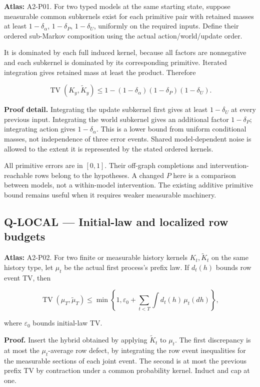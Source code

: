 \documentclass[
  11pt,
  a4paper,
]{article}
\begin{document}
\textbf{Atlas:} A2-P01. For two typed models at the same starting state,
suppose measurable common subkernels exist for each primitive pair with
retained masses at least \(1-\delta_\alpha\), \(1-\delta_P\),
\(1-\delta_U\), uniformly on the required inputs. Define their ordered
sub-Markov composition using the actual action/world/update order.

It is dominated by each full induced kernel, because all factors are
nonnegative and each subkernel is dominated by its corresponding
primitive. Iterated integration gives retained mass at least the
product. Therefore

\[\operatorname{TV}(K_y,\widetilde K_y)
\le1-(1-\delta_\alpha)(1-\delta_P)(1-\delta_U).\]

\textbf{Proof detail.} Integrating the update subkernel first gives at
least \(1-\delta_U\) at every previous input. Integrating the world
subkernel gives an additional factor \(1-\delta_P\); integrating action
gives \(1-\delta_\alpha\). This is a lower bound from uniform
conditional masses, not independence of three error events. Shared
model-dependent noise is allowed to the extent it is represented by the
stated ordered kernels.

All primitive errors are in \([0,1]\). Their off-graph completions and
intervention-reachable rows belong to the hypotheses. A changed \(P\)
here is a comparison between models, not a within-model intervention.
The existing additive primitive bound remains useful when it requires
weaker measurable machinery.

\subsection{Q-LOCAL --- Initial-law and localized row
budgets}\label{q-local-initial-law-and-localized-row-budgets}

\textbf{Atlas:} A2-P02. For two finite or measurable history kernels
\(K_t,\widetilde K_t\) on the same history type, let \(\mu_t\) be the
actual first process's prefix law. If \(d_t(h)\) bounds row event TV,
then

\[\operatorname{TV}(\mu_T,\widetilde\mu_T)
\le \min\left\{1,\varepsilon_0+
\sum_{t<T}\int d_t(h)\,\mu_t(dh)\right\},\]

where \(\varepsilon_0\) bounds initial-law TV.

\textbf{Proof.} Insert the hybrid obtained by applying
\(\widetilde K_t\) to \(\mu_t\). The first discrepancy is at most the
\(\mu_t\)-average row defect, by integrating the row event inequalities
for the measurable sections of each joint event. The second is at most
the previous prefix TV by contraction under a common probability kernel.
Induct and cap at one.
\end{document}
